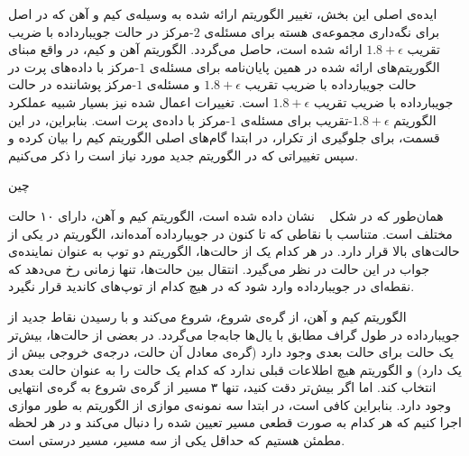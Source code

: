 
ایده‌ی اصلی این بخش، تغییر الگوریتم ارائه شده به وسیله‌ی کیم و آهن  که در اصل برای نگه‌داری مجموعه‌ی هسته برای مسئله‌ی $2$-مرکز در حالت جویبارداده با ضریب تقریب $1.8 + \epsilon$ ارائه شده است، حاصل می‌گردد. الگوریتم آهن و کیم، در واقع مبنای الگوریتم‌های ارائه شده در همین پایان‌نامه برای مسئله‌ی $1$-مرکز با داده‌های پرت در حالت جویبارداده با ضریب تقریب $1.8 + \epsilon$ و مسئله‌ی $1$-مرکز پوشاننده در حالت جویبارداده با ضریب تقریب $1.8 + \epsilon$ است. تغییرات اعمال شده نیز‌ بسیار شبیه عملکرد الگوریتم $1.8 + \epsilon$-تقریب برای مسئله‌ی $1$-مرکز با داده‌ی پرت است. بنابراین، در این قسمت، برای جلوگیری از تکرار، در ابتدا گام‌های اصلی الگوریتم کیم را بیان کرده و سپس تغییراتی که در الگوریتم جدید مورد نیاز است را ذکر می‌کنیم.

‌چین

همان‌طور که در شکل ~ نشان داده شده است، الگوریتم کیم و آهن، دارای ۱۰ حالت مختلف است. متناسب با نقاطی که تا کنون در جویبارداده آمده‌اند، الگوریتم در یکی از حالت‌های بالا قرار دارد. در هر کدام‌ یک از حالت‌‌ها، الگوریتم دو توپ به عنوان نماینده‌ی جواب در این حالت در نظر می‌گیرد. انتقال بین حالت‌ها، تنها زمانی رخ می‌دهد که نقطه‌ای در جویبارداده وارد شود که در هیچ‌ کدام از توپ‌های کاندید قرار نگیرد.

الگوریتم کیم و آهن، از گره‌ی شروع، شروع می‌کند و با رسیدن نقاط جدید از جویبارداده در طول گراف مطابق‌ با یال‌ها جابه‌جا می‌گردد. در بعضی از حالت‌ها، بیش‌تر یک حالت برای حالت بعدی وجود دارد (گره‌ی معادل آن حالت، درجه‌ی خروجی بیش از یک دارد) و الگوریتم هیچ اطلاعات قبلی ندارد که کدام یک حالت را به عنوان حالت بعدی انتخاب کند. اما اگر بیش‌تر دقت کنید، تنها ۳ مسیر از گره‌ی شروع به گره‌ی انتهایی وجود دارد. بنابراین کافی است، در ابتدا سه نمونه‌ی موازی از الگوریتم به طور موازی اجرا کنیم که هر کدام به صورت قطعی مسیر تعیین شده را دنبال می‌کند و در هر لحظه مطمئن هستیم که حداقل یکی از سه مسیر، مسیر درستی است.

